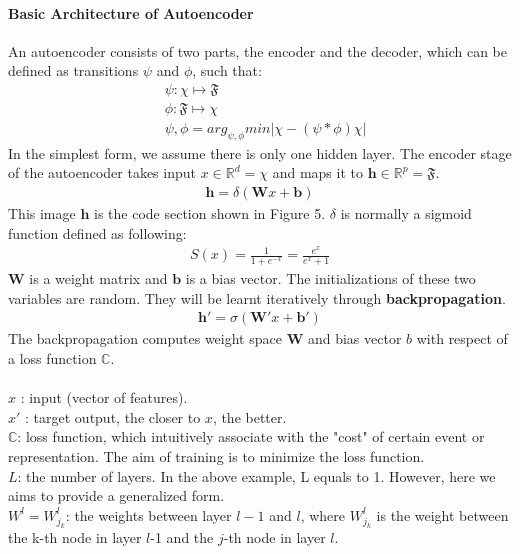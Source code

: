 \documentclass[paper=a4, fontsize=12pt]{scrartcl}
\begin{document}
\paragraph{Basic Architecture of Autoencoder}
An autoencoder consists of two parts, the encoder and the decoder, which can be defined as transitions $\psi$ and $\phi$, such that:
\begin{align*}
& \psi : \chi \mapsto \mathfrak{F} \\
& \phi : \mathfrak{F} \mapsto \chi \\
& \psi, \phi = arg_{\psi, \phi} min \lvert \chi - (\psi * \phi) \chi \rvert
\end{align*}
In the simplest form, we assume there is only one hidden layer. The encoder stage of the autoencoder takes input $x \in \mathbb{R}^{d} = \chi$ and maps it to $\mathbf{h} \in \mathbb{R}^{p} = \mathfrak{F}$. \\
\begin{align*}
\mathbf{h} = \delta (\mathbf{W}x + \mathbf{b})
\end{align*}
This image $\mathbf{h}$ is the code section shown in Figure 5. $\delta$ is normally a sigmoid function defined as following: \\
\begin{align*}
S(x) = \frac{1}{1 + e^{-x}} = \frac{e^x}{e^x + 1}
\end{align*}
$\mathbf{W}$ is a weight matrix and $\mathbf{b}$ is a bias vector. The initializations of these two variables are random. They will be learnt iteratively through \textbf{backpropagation}. \\
\begin{align*}
\mathbf{h'} = \sigma (\mathbf{W'}x + \mathbf{b'})
\end{align*}
The backpropagation computes weight space $\mathbf{W}$ and bias vector $b$ with respect of a loss function $\mathbb{C}$.\\\\
$x$ : input (vector of features). \\
$x'$ : target output, the closer to $x$, the better. \\
$\mathbb{C}$: loss function, which intuitively associate with the "cost" of certain event or representation. The aim of training is to minimize the loss function. \\
$L$: the number of layers. In the above example, L equals to 1. However, here we aims to provide a generalized form.\\
$W^l = W^l_{j_k}$: the weights between layer  $l-1$ and $l$, where $W^l_{j_k}$ is the weight between the k-th node in layer $l$-1 and the $j$-th node in layer $l$.\\
\end{document}

